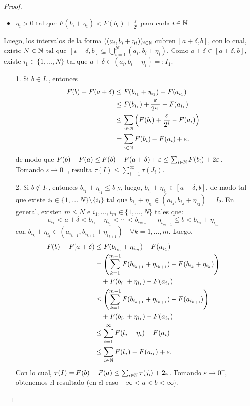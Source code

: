 \begin{proof}
\begin{enumerate}
\begin{itemize}
			\item $\eta_i > 0$ tal que $F(b_i + \eta_i) < F(b_i) + \frac{\varepsilon}{2^i}$ para cada $i \in \mathbb{N}$.
		\end{itemize}
		Luego, los intervalos de la forma $((a_i,b_i + \eta_i))_{i\in\mathbb{N}}$ cubren $[a + \delta, b]$, con lo cual, existe $N \in \mathbb{N}$ tal que $[a + \delta,b] \subseteq \bigcup_{i=1}^{N} (a_i, b_i + \eta_i)$. Como $a + \delta \in [a + \delta,b]$, existe $i_1 \in \{1,\dots,N\}$ tal que $a + \delta \in (a_i,b_i + \eta_i) =: I_1$.
		\begin{enumerate}
			\item[1.] Si $b \in I_1$, entonces
			\begin{align*}
				F(b) - F(a + \delta) &\leq F(b_{i_1} + \eta_{i_1}) - F(a_{i_1}) \\
				&\leq F(b_{i_1}) + \frac{\varepsilon}{2^{i_{1}}} - F(a_{i_{1}}) \\
				&\leq \sum_{i\in\mathbb{N}} \left(F(b_i) + \frac{\varepsilon}{2^i} - F(a_i)\right) \\
				&= \sum_{i\in\mathbb{N}} F(b_i) - F(a_i) + \varepsilon
			.\end{align*}
			de modo que $F(b) - F(a) \leq F(b) - F(a + \delta) + \varepsilon \leq \sum_{i\in\mathbb{N}}^{} F(b_i) + 2 \varepsilon$. Tomando $\varepsilon \longrightarrow 0^+$, resulta $\tau(I) \leq \sum_{i=1}^{\infty} \tau(J_i)$. \checkmark

			\item[2.] Si $b \not\in I_1$, entonces $b_{i_{1}} + \eta_{i_{1}} \leq b$ y, luego, $b_{i_{1}} + \eta_{i_{1}} \in [a+\delta,b]$, de modo tal que existe $i_{2} \in \{1,\dots,N\} \setminus \{i_{1}\}$ tal que $b_{i_{1}} + \eta_{i_{1}} \in (a_{i_{2}},b_{i_{2}}+\eta_{i_{2}}) = I_2$. En general, existen $m \leq N$ e $i_1,\dots,i_m \in \{1,\dots,N\}$ tales que:
			\[ a_{i_{1}} < a + \delta < b_{i_{1}} + \eta_{i_{1}} < \cdots < b_{i_{m-1}} - \eta_{i_{m-1}} \leq b < b_{i_m} + \eta_{i_m} \]
			con $b_{i_k} + \eta_{i_k} \in (a_{i_{k+1}}, b_{i_{k+1}} + \eta_{i_{k+1}}) \quad \forall k = 1,\dots,m$. Luego,
			\begin{align*}
				F(b) - F(a + \delta) &\leq F(b_{i_m} + \eta_{i_m}) - F(a_{i_1}) \\
				&= \left( \sum_{k=1}^{m-1} F(b_{i_{k+1}} + \eta_{i_{k+1}}) - F(b_{i_k} + \eta_{i_k}) \right) \\
				& \quad + F(b_{i_{1}} + \eta_{i_{1}}) - F(a_{i_{1}}) \\
				&\leq \left( \sum_{k=1}^{m-1} F(b_{i_{k+1}} + \eta_{i_{k+1}}) - F(a_{i_{k+1}}) \right) \\
				& \quad + F(b_{i_{1}} + \eta_{i_{1}}) - F(a_{i_{1}}) \\
				&\leq \sum_{i=1}^{\infty} F(b_i + \eta_i) - F(a_i) \\
				&\leq \sum_{i\in\mathbb{N}} F(b_i) - F(a_{i_{1}}) + \varepsilon
			.\end{align*}
			Con lo cual, $\tau(I) = F(b) - F(a) \leq \sum_{i\in\mathbb{N}} \tau(j_i) + 2\varepsilon$. Tomando $\varepsilon \longrightarrow 0^+$, obtenemos el resultado (en el caso $-\infty < a < b < \infty$).


\end{enumerate}
\end{enumerate}
\end{proof}

